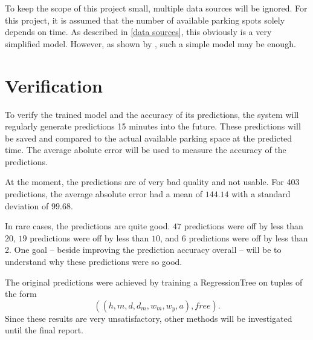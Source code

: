 \documentclass[journal,10pt]{IEEEtran}
\newcommand{\subtask}[1]{\begin{quote}\textbf{#1}\end{quote}}
\newcommand{\hod}{h}
\newcommand{\moh}{m}
\newcommand{\dow}{d}
\newcommand{\dom}{d_m}
\newcommand{\wom}{w_m}
\newcommand{\woy}{w_y}
\newcommand{\yyy}{a}
\begin{document}
To keep the scope of this project small, multiple data sources will be ignored. For this project, it is assumed that the number of available parking spots solely depends on time. As described in \ref{data sources}, this obviously is a very simplified model. However, as shown by \cite{parkendd}, such a simple model may be enough. 


\section{Verification}
To verify the trained model and the accuracy of its predictions, the system will regularly generate predictions 15 minutes into the future. These predictions will be saved and compared to the actual available parking space at the predicted time. The average abolute error will be used to measure the accuracy of the predictions.

At the moment, the predictions are of very bad quality and not usable. For 403 predictions, the average absolute error had a mean of \(144.14\) with a standard deviation of \(99.68\).

In rare cases, the predictions are quite good. \(47\) predictions were off by less than \(20\), 
\(19\) predictions were off by less than \(10\), and \(6\) predictions were off by less than 2. One goal -- beside improving the prediction accuracy overall -- will be to understand why these predictions were so good.

The original predictions were achieved by training a RegressionTree on tuples of the form 
\[
((\hod, \moh, \dow, \dom, \wom, \woy, \yyy), free)\text{.}
\]
Since these results are very unsatisfactory, other methods will be investigated until the final report.

\end{document}
